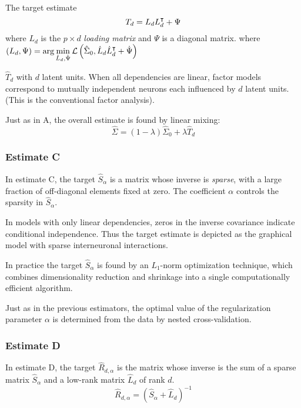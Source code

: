 The target estimate
\begin{equation}
T_d = L_dL_d^\intercal + \Psi
\end{equation}
where $L_d$ is the $p\times d$ \emph{loading matrix} and $\Psi$ is a diagonal matrix. 
where $(L_d,\Psi) = \arg\min\limits_{\dot L_d,\dot\Psi} \mathcal L\left(\hat\Sigma_0,\dot L_d \dot L_d^\intercal + \dot \Psi\right)$ 



 $ \hat T_d$ with $ d$ latent units. When all dependencies are linear, factor models correspond to mutually independent neurons each influenced by $ d$ latent units. (This is  the conventional factor analysis).

Just as in A, the overall estimate is found by linear mixing:
\begin{equation}
\hat\Sigma = (1-\lambda)\hat\Sigma_0 + \lambda\hat T_d
\end{equation}

\subsubsection*{Estimate C}
In estimate C, the target $ \hat S_\alpha$ is a matrix whose inverse is \emph{sparse}, with a large fraction of off-diagonal elements fixed at zero. The coefficient $ \alpha$ controls the sparsity in $ \hat S_\alpha$.

In models with only linear dependencies, zeros in the inverse covariance indicate conditional independence. Thus the target estimate is depicted as the graphical model with sparse interneuronal interactions.

In practice the target $\hat S_\alpha$ is found by an $ L_1$-norm optimization technique, which combines dimensionality reduction and shrinkage into a single computationally efficient algorithm.

Just as in the previous estimators, the optimal value of the regularization parameter $ \alpha$ is determined from the data by nested cross-validation.

\subsubsection*{Estimate D}
In estimate D, the target $\hat R_{d,\alpha}$ is the matrix whose inverse is the sum of a sparse matrix $\hat S_\alpha$ and a low-rank matrix $\hat L_d$ of rank $d$.
\begin{equation}
\hat R_{d,\alpha} = (\hat S_\alpha + \hat L_d)^{-1}
\end{equation}

